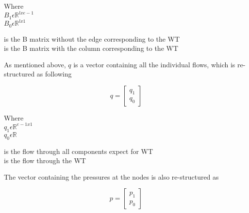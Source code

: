 \begin{minipage}[t]{0.20\textwidth}
Where\\
\hspace*{8mm} $B_1 \epsilon \mathbb{R}^{lxe-1}$  \\
\hspace*{8mm} $B_0 \epsilon \mathbb{R}^{lx1} $ 
\end{minipage}
\begin{minipage}[t]{0.68\textwidth}
\vspace*{2mm}
\hspace*{4mm} is the B matrix without the edge corresponding to the WT\\
\hspace*{4mm} is the B matrix with the column corresponding to the WT 
\end{minipage}

As mentioned above, $q$ is a vector containing all the individual flows, which 
is re-structured as following

\begin{equation}
q =
\begin{bmatrix}
         q_1 \\
	q_0 
\end{bmatrix}
\label{qmatrix}
\end{equation}

\begin{minipage}[t]{0.20\textwidth}
Where\\
\hspace*{8mm} $q_1 \epsilon \mathbb{R}^{e-1x1}$  \\
\hspace*{8mm} $q_0 \epsilon \mathbb{R} $ 
\end{minipage}
\begin{minipage}[t]{0.68\textwidth}
\vspace*{2mm}
\hspace*{4mm} is the flow through all components expect for WT\\
\hspace*{4mm} is the flow through the WT 
\end{minipage}

The vector containing the pressures at the nodes is also re-structured as

\begin{equation}
p =
\begin{bmatrix}
         p_1 \\
	p_0 
\end{bmatrix}
\end{equation}

